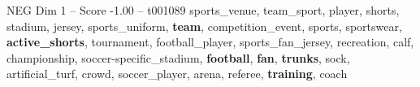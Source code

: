 \begin{textsample}{NEG Dim 1 – Score -1.00 – t001089}  \label{ex:f1_neg_033}
sports\_venue, team\_sport, player, shorts, stadium, jersey, sports\_uniform, \textbf{team}, competition\_event, sports, sportswear, \textbf{active\_shorts}, tournament, football\_player, sports\_fan\_jersey, recreation, calf, championship, soccer-specific\_stadium, \textbf{football}, \textbf{fan}, \textbf{trunks}, sock, artificial\_turf, crowd, soccer\_player, arena, referee, \textbf{training}, coach

\end{textsample}
